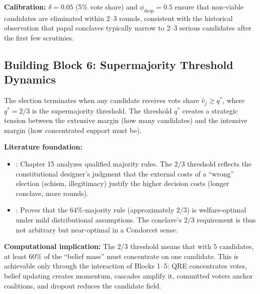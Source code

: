 \textbf{Calibration:} $\delta = 0.05$ (5\% vote share) and $\phi_{\text{drop}} = 0.5$
ensure that non-viable candidates are eliminated within 2--3 rounds, consistent with
the historical observation that papal conclaves typically narrow to 2--3 serious
candidates after the first few scrutinies.


\subsection{Building Block 6: Supermajority Threshold Dynamics}
\label{sec:bp-supermajority}

\begin{tcolorbox}[colback=blue!3!white, colframe=blue!60!black, title=Axiom VTM-6: Qualified Majority]
The election terminates when any candidate receives vote share $\hat{v}_j \geq q^*$,
where $q^* = 2/3$ is the supermajority threshold. The threshold $q^*$ creates a
strategic tension between the extensive margin (how many candidates) and the
intensive margin (how concentrated support must be).
\end{tcolorbox}

\textbf{Literature foundation:}
\begin{itemize}[nosep]
\item \citet{buchanan1962calculus}: Chapter 15 analyzes qualified majority rules.
      The $2/3$ threshold reflects the constitutional designer's judgment that the
      external costs of a ``wrong'' election (schism, illegitimacy) justify the
      higher decision costs (longer conclave, more rounds).
\item \citet{caplin1988majority}: Proves that the $64\%$-majority rule (approximately
      $2/3$) is welfare-optimal under mild distributional assumptions. The conclave's
      $2/3$ requirement is thus not arbitrary but near-optimal in a Condorcet sense.
\end{itemize}

\textbf{Computational implication:} The $2/3$ threshold means that with 5 candidates,
at least 60\% of the ``belief mass'' must concentrate on one candidate. This is
achievable only through the interaction of Blocks 1--5: QRE concentrates votes,
belief updating creates momentum, cascades amplify it, committed voters anchor
coalitions, and dropout reduces the candidate field.


